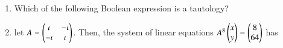 \documentclass[journal]{IEEEtran}
\numberwithin{equation}{enumi}
\numberwithin{figure}{enumi}
\begin{document}
\begin{enumerate}
    \item 
    Which of the following Boolean expression is a tautology?

    \hfill{}
    
    \begin{enumerate}
    \end{enumerate}

    \item let $A = \begin{pmatrix}\iota&-\iota\\ -\iota&\iota\end{pmatrix}$.
    Then, the system of linear equations $A^8\begin{pmatrix}x\\y\end{pmatrix} = \begin{pmatrix}8 \\ 64\end{pmatrix}$ has 

    \hfill{}
    
    \begin{enumerate}
    \end{enumerate}

\end{enumerate}
\end{document}
